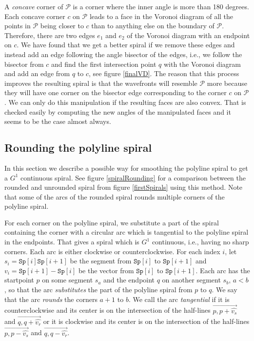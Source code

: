 \documentclass[3p]{elsarticle}
\newcommand{\PP}{\mathcal{P}}
\newcommand{\spiral}{\texttt{Sp}}
\newcommand{\ora}[1]{\overrightarrow{#1}}
\begin{document}
A \emph{concave} corner of $\PP$ is a corner where the inner angle is more than 180 degrees.
Each concave corner $c$ on $\PP$ leads to a face in the Voronoi diagram of all the points
in $\PP$ being closer to $c$ than to anything else on the boundary of $\PP$.
Therefore, there are two edges $e_1$ and $e_2$ of the Voronoi diagram with an endpoint on $c$.
We have found that we get a better spiral if we remove these
edges and instead add an edge following the angle bisector of the edges, i.e., we follow the bisector
from $c$ and find the first intersection point $q$ with the Voronoi diagram and add an edge from
$q$ to $c$, see figure \ref{finalVD}.
The reason that this process improves the resulting spiral is that the wavefronts
will resemble $\PP$ more because they will have one corner on the
bisector edge corresponding to the corner $c$ on $\PP$.
We can only do this manipulation if the resulting
faces are also convex. That is checked easily by computing the new angles of the manipulated faces
and it seems to be the case almost always.

\subsection{Rounding the polyline spiral}\label{rounding}

In this section we describe a possible way for smoothing the polyline spiral to get a
$G^1$ continuous spiral.
See figure \ref{spiralRounding} for a comparison between the rounded and unrounded spiral from figure
\ref{firstSpirals} using this method.
Note that some of the arcs of the rounded spiral rounds multiple corners
of the polyline spiral.

For each corner on the polyline spiral, we substitute a part of the spiral containing the corner with a
circular arc which is tangential to the polyline spiral in the endpoints.
That gives a spiral which is $G^1$ continuous, i.e., having no sharp corners. Each arc is either
clockwise or counterclockwise. For each index $i$, let
$s_i=\spiral[i]\spiral[i+1]$ be the segment from $\spiral[i]$ to $\spiral[i+1]$ and
$v_i=\spiral[i+1]-\spiral[i]$ be the vector from $\spiral[i]$ to $\spiral[i+1]$.
Each arc has the startpoint $p$ on some segment $s_a$ and the endpoint $q$
on another segment $s_b$, $a<b$, so that the arc \emph{substitutes} the part of the
polyline spiral from $p$ to $q$. We say that the arc \emph{rounds} the corners
$a+1$ to $b$.
We call the arc \emph{tangential} if it is counterclockwise and its center is on the intersection of the
half-lines $\ora{p,p+\widehat {v_s}}$ and $\ora{q,q+\widehat {v_r}}$ or it is
clockwise and its center is on the intersection of the half-lines
$\ora{p,p-\widehat {v_s}}$ and $\ora{q,q-\widehat {v_r}}$.
\end{document}
